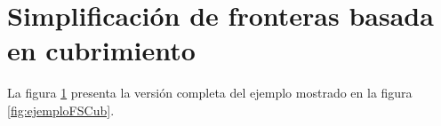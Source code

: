 \section{Simplificación de fronteras basada en cubrimiento}\label{EXE:sfbc}
La figura \ref{EXE:sfbc} presenta la versión completa del ejemplo mostrado en la figura \ref{fig:ejemploFSCub}.
\endgroup
\begin{figure}[H]
  \centerfloat


\end{figure}
